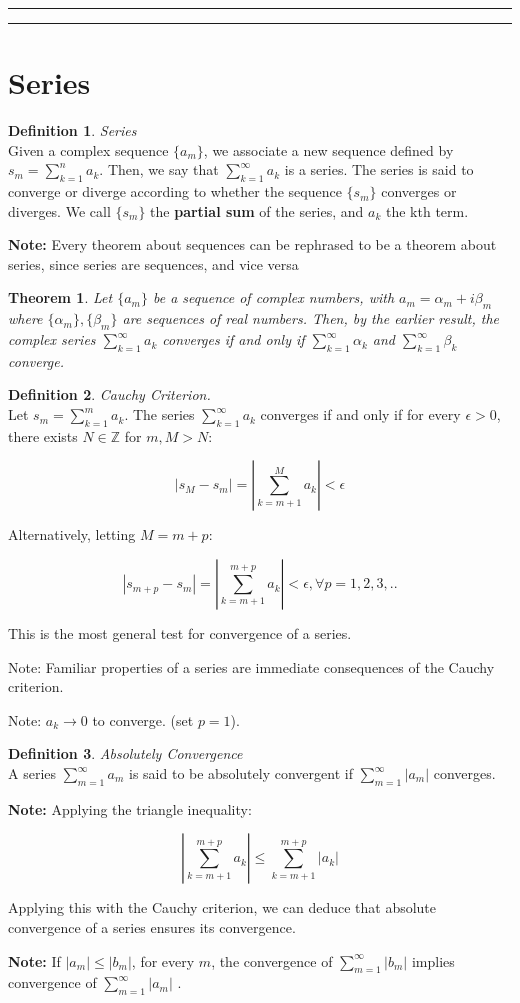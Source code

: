 \documentclass{article}
\newtheorem{theorem}{Theorem}[section]
\theoremstyle{definition}
\newtheorem{definition}{Definition}[section]
\newcommand{\Section}[1]{\hrule\hrule\section{#1}}
\newcommand{\Def}[2]{
\begin{shaded*}
\begin{definition}{\textit{#1}}\\#2\end{definition}
\end{shaded*}
}
\begin{document}
\Section{Series}
\Def{Series}{Given a complex sequence $\{a_m\}$, we associate a new sequence defined by $s_m = \sum_{k=1}^{n}a_k$. Then, we say that $\sum_{k=1}^{\infty}a_k$ is a series. The series is said to converge or diverge according to whether the sequence $\{s_m\}$ converges or diverges. We call $\{s_m\}$ the \textbf{partial sum} of the series, and $a_k$ the kth term.

\textbf{Note:} Every theorem about sequences can be rephrased to be a theorem about series, since series are sequences, and vice versa
}
\begin{theorem}
Let $\{a_m\}$ be a sequence of complex numbers, with $a_m = \alpha_m+ i \beta_m$ where $\{\alpha_m\}, \{\beta_m\}$ are sequences of real numbers. Then, by the earlier result, the complex series $\sum_{k=1}^{\infty}a_k$ converges if and only if $\sum_{k=1}^{\infty}\alpha_k$ and $\sum_{k=1}^{\infty}\beta_k$ converge.
\end{theorem}


\Def{Cauchy Criterion.}{Let $s_m = \sum_{k=1}^{m}a_k$. The series $\sum_{k=1}^{\infty}a_k$ converges if and only if for every $\epsilon>0$, there exists $N \in \mathbb{Z}$ for $m, M>N$:

$$|s_M - s_m| = \left|\sum_{k=m+1}^{M}a_k\right| < \epsilon$$

Alternatively, letting $M = m+p$:

$$|s_{m+p} - s_m| = \left|\sum_{k=m+1}^{m+p}a_k\right| < \epsilon, \forall p = 1,2,3,..$$

This is the most general test for convergence of a series. 

Note: Familiar properties of a series are immediate consequences of the Cauchy criterion.

Note: $a_k \to 0$ to converge. (set $p=1$).
 }

\Def{Absolutely Convergence}{A series $\sum_{m=1}^{\infty}a_m$ is said to be absolutely convergent if $\sum_{m=1}^{\infty}|a_m|$ converges. 

\textbf{Note:} Applying the triangle inequality:

$$\left|\sum_{k=m+1}^{m+p}a_k\right| \leq \sum_{k=m+1}^{m+p}\left|a_k\right|$$

Applying this with the Cauchy criterion, we can deduce that absolute convergence of a series ensures its convergence. 

\textbf{Note:} If $|a_m| \leq |b_m|$, for every $m$, the convergence of $\sum_{m=1}^{\infty} |b_m|$ implies convergence of $\sum_{m=1}^{\infty} |a_m|$ .
}
\end{document}
